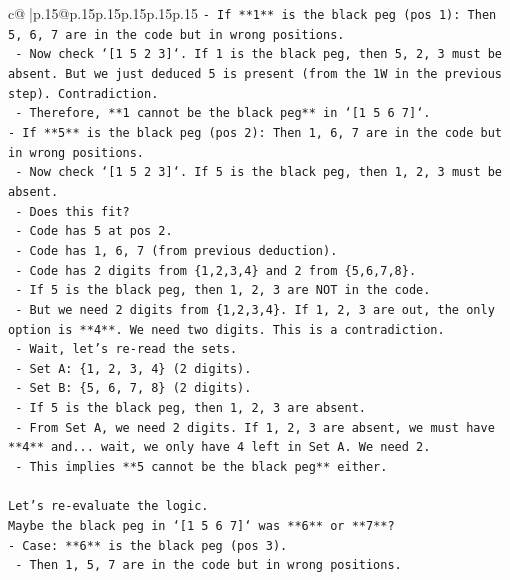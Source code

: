 \documentclass{article}
\begin{document}
{\begin{supertabular}{c@{$\;$}|p{.15\linewidth}@{}p{.15\linewidth}p{.15\linewidth}p{.15\linewidth}p{.15\linewidth}p{.15\linewidth}}
{{{\texttt{{-}   If **1** is the black peg (pos 1): Then 5, 6, 7 are in the code but in wrong positions.} \\
\texttt{    {-}   Now check `{[}1 5 2 3{]}`. If 1 is the black peg, then 5, 2, 3 must be absent. But we just deduced 5 is present (from the 1W in the previous step). Contradiction.} \\
\texttt{    {-}   Therefore, **1 cannot be the black peg** in `{[}1 5 6 7{]}`.} \\
\texttt{{-}   If **5** is the black peg (pos 2): Then 1, 6, 7 are in the code but in wrong positions.} \\
\texttt{    {-}   Now check `{[}1 5 2 3{]}`. If 5 is the black peg, then 1, 2, 3 must be absent.} \\
\texttt{    {-}   Does this fit?} \\
\texttt{        {-}   Code has 5 at pos 2.} \\
\texttt{        {-}   Code has 1, 6, 7 (from previous deduction).} \\
\texttt{        {-}   Code has 2 digits from \{1,2,3,4\} and 2 from \{5,6,7,8\}.} \\
\texttt{        {-}   If 5 is the black peg, then 1, 2, 3 are NOT in the code.} \\
\texttt{        {-}   But we need 2 digits from \{1,2,3,4\}. If 1, 2, 3 are out, the only option is **4**. We need two digits. This is a contradiction.} \\
\texttt{        {-}   Wait, let's re{-}read the sets.} \\
\texttt{        {-}   Set A: \{1, 2, 3, 4\} (2 digits).} \\
\texttt{        {-}   Set B: \{5, 6, 7, 8\} (2 digits).} \\
\texttt{        {-}   If 5 is the black peg, then 1, 2, 3 are absent.} \\
\texttt{        {-}   From Set A, we need 2 digits. If 1, 2, 3 are absent, we must have **4** and... wait, we only have 4 left in Set A. We need 2.} \\
\texttt{        {-}   This implies **5 cannot be the black peg** either.} \\
\\ 
\texttt{Let's re{-}evaluate the logic.} \\
\texttt{Maybe the black peg in `{[}1 5 6 7{]}` was **6** or **7**?} \\
\texttt{{-}   Case: **6** is the black peg (pos 3).} \\
\texttt{    {-}   Then 1, 5, 7 are in the code but in wrong positions.} \\
}}}
\end{supertabular}}
\end{document}
